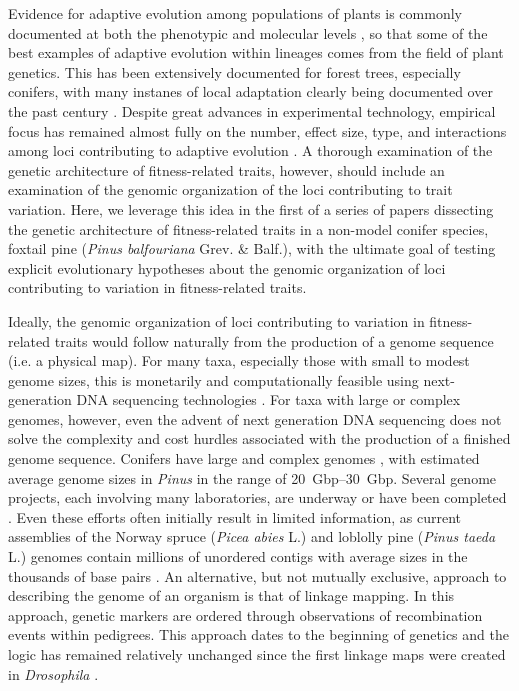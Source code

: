 \documentclass[11pt]{article}
\begin{document}
Evidence for adaptive evolution among populations of plants is commonly documented at both the phenotypic 
and molecular levels \citep{Kawecki:2004, Pannell:2013}, so that some of the best
examples of adaptive evolution within lineages comes from the field of plant genetics.
This has been extensively documented for forest trees, especially conifers, with many instanes of local adaptation clearly
being documented over the past century \citep{White:2007, Neale:2011}. Despite great advances in experimental technology, empirical 
focus has remained almost fully on the number, effect size, type, and interactions among loci contributing 
to adaptive evolution \citep{Neale:2011, Alberto:2013}.  A thorough examination of the 
genetic architecture of fitness-related traits, however, should include 
an examination of the genomic organization of the loci contributing to trait variation. Here, we leverage 
this idea in the first of a series of papers dissecting the genetic architecture of fitness-related 
traits in a non-model conifer species, foxtail pine (\textit{Pinus balfouriana} Grev. \& Balf.), with the 
ultimate goal of testing explicit evolutionary hypotheses about the genomic organization of loci 
contributing to variation in fitness-related traits.

Ideally, the genomic organization of loci contributing to variation in fitness-related traits would follow 
naturally from the production of a genome sequence (i.e. a physical map). For many taxa, especially those with 
small to modest genome sizes, this is monetarily and computationally feasible using next-generation DNA sequencing 
technologies \citep{Koboldt:2013}. For taxa with large or complex genomes, however, even the advent of next generation DNA 
sequencing does not solve the complexity and cost hurdles associated with the production of a finished genome sequence. Conifers have large and 
complex genomes \citep{Murray:1998, Ahuja:2005}, with estimated average genome sizes in \textit{Pinus} in the 
range of \SIrange{20}{30}{Gbp}. Several genome projects, each involving many laboratories, are underway or have been 
completed \citep{Mackay:2012}. Even these efforts often initially result in limited information, 
as current assemblies of the Norway spruce (\textit{Picea abies} L.) and loblolly pine (\textit{Pinus taeda} L.) genomes 
contain millions of unordered contigs with average sizes in the thousands of base pairs \citep{Nystedt:2013}. An alternative, but not mutually exclusive, approach to describing the genome of an organism 
is that of linkage mapping. In this approach, genetic markers are ordered through observations of recombination events 
within pedigrees. This approach dates to the beginning of genetics and the logic has remained relatively unchanged 
since the first linkage maps were created in \textit{Drosophila} \citep{Sturtevant:1913}.
\end{document}
